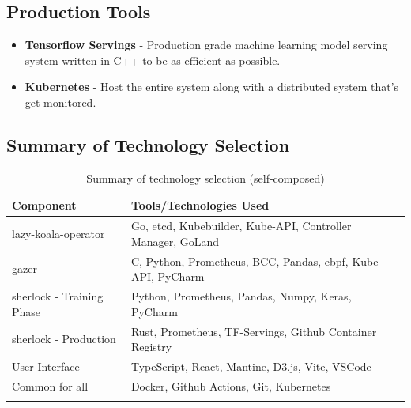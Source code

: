 \subsection{Production Tools}
\begin{itemize}[noitemsep,nolistsep] 
    \item \textbf{Tensorflow Servings} - Production grade machine learning model serving system written in C++ to be as efficient as possible.
    \item \textbf{Kubernetes} - Host the entire system along with a distributed system that's get monitored.
\end{itemize}

\subsection{Summary of Technology Selection}

\begin{longtable}{|p{43mm}|p{110mm}|}
    \hline
    \textbf{Component} &
    \textbf{Tools/Technologies Used} \\ \hline

    \ac{lazy-koala-operator} &
    Go, etcd, Kubebuilder, Kube-API, Controller Manager, GoLand \\ \hline

    \ac{gazer} &
    C, Python, Prometheus, BCC, Pandas, \ac{ebpf}, Kube-API, PyCharm \\ \hline

    \ac{sherlock} - Training Phase &
    Python, Prometheus, Pandas, Numpy, Keras, PyCharm \\ \hline

    \ac{sherlock} - Production &
    Rust, Prometheus, TF-Servings, Github Container Registry\\ \hline

    User Interface &
    TypeScript, React, Mantine, D3.js, Vite, VSCode \\ \hline

    Common for all &
    Docker, Github Actions, Git, Kubernetes \\ \hline

    \caption{Summary of technology selection (self-composed)}
\end{longtable}
